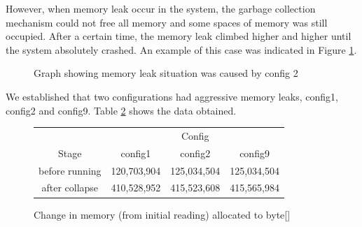 However, when memory leak occur in the system, the garbage collection mechanism could not free all memory and some spaces of memory was still occupied. After a certain time, the memory leak climbed higher and higher until the system absolutely crashed. An example of this case was indicated in Figure  \ref{config2}.

\begin{figure}[ht]
 \centering
 \caption{Graph showing memory leak situation was caused by config 2}
 \label{config2}
\end{figure}

We established that two configurations had aggressive memory leaks, config1, config2 and config9. Table \ref{func_mem_leak_table} shows the data obtained.

\begin{figure}[h]
 \centering
\begin{tabular}{| c | c | c | c |}
 \hline
  & \multicolumn{3}{|c|}{Config} \\ \cline{2-4}
 Stage & config1 & config2 & config9\\
 \hline
 before running & 120,703,904 & 125,034,504 & 125,034,504 \\
 after collapse & 410,528,952 & 415,523,608 & 415,565,984 \\
 \hline
\end{tabular}
 \caption{Change in memory (from initial reading) allocated to byte[]}
 \label{func_mem_leak_table}
\end{figure}

